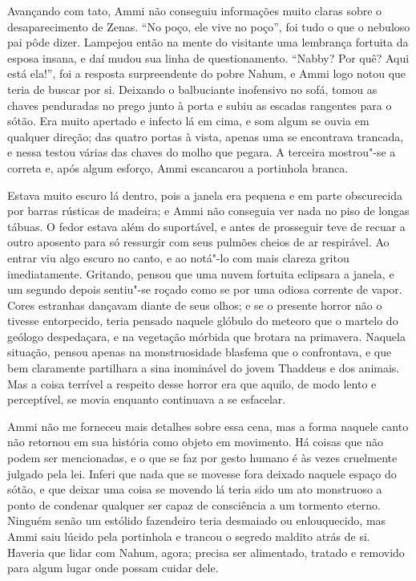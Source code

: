 Avançando com tato, Ammi não conseguiu informações muito claras sobre o
desaparecimento de Zenas. ``No poço, ele vive no poço'', foi tudo
o que o nebuloso pai pôde dizer. Lampejou então na mente do visitante
uma lembrança fortuita da esposa insana, e daí mudou sua linha de
questionamento. ``Nabby? Por quê? Aqui está ela!'', foi a resposta
surpreendente do pobre Nahum, e Ammi logo notou que teria de buscar por
si. Deixando o balbuciante inofensivo no sofá, tomou as chaves
penduradas no prego junto à porta e subiu as escadas rangentes para o
sótão. Era muito apertado e infecto lá em cima, e som algum se ouvia em
qualquer direção; das quatro portas à vista, apenas uma se encontrava
trancada, e nessa testou várias das chaves do molho que pegara. A
terceira mostrou"-se a correta e, após algum esforço, Ammi escancarou
a portinhola branca.

Estava muito escuro lá dentro, pois a janela era pequena e em parte
obscurecida por barras rústicas de madeira; e Ammi não conseguia ver
nada no piso de longas tábuas. O fedor estava além do suportável, e
antes de prosseguir teve de recuar a outro aposento para só ressurgir
com seus pulmões cheios de ar respirável. Ao entrar viu algo escuro no
canto, e ao notá"-lo com mais clareza gritou imediatamente. Gritando,
pensou que uma nuvem fortuita eclipsara a janela, e um segundo depois
sentiu"-se roçado como se por uma odiosa corrente de vapor. Cores
estranhas dançavam diante de seus olhos; e se o presente horror não o
tivesse entorpecido, teria pensado naquele glóbulo do meteoro que o
martelo do geólogo despedaçara, e na vegetação mórbida que brotara na
primavera. Naquela situação, pensou apenas na monstruosidade blasfema
que o confrontava, e que bem claramente partilhara a sina inominável do
jovem Thaddeus e dos animais. Mas a coisa terrível a respeito desse
horror era que aquilo, de modo lento e perceptível, se movia enquanto
continuava a se esfacelar.

Ammi não me forneceu mais detalhes sobre essa cena, mas a forma naquele
canto não retornou em sua história como objeto em movimento. Há coisas
que não podem ser mencionadas, e o que se faz por gesto humano é às
vezes cruelmente julgado pela lei. Inferi que nada que se movesse fora
deixado naquele espaço do sótão, e que deixar uma coisa se movendo lá
teria sido um ato monstruoso a ponto de condenar qualquer ser capaz de
consciência a um tormento eterno. Ninguém senão um estólido fazendeiro
teria desmaiado ou enlouquecido, mas Ammi saiu lúcido pela portinhola e
trancou o segredo maldito atrás de si. Haveria que lidar com Nahum,
agora; precisa ser alimentado, tratado e removido para algum lugar onde
possam cuidar dele.

